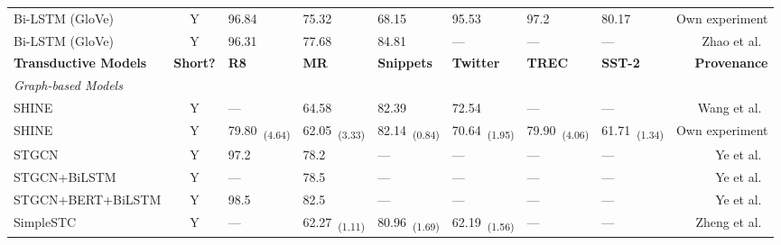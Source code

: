 \documentclass[runningheads]{llncs}
\begin{document}
\begin{table*}[!ht]
\begin{threeparttable}
{\begin{tabular}{lcllllllr}
            Bi-LSTM (GloVe)                         & Y                   & 96.84            & 75.32          & 68.15                             & 95.53            & 97.2          & 80.17          & Own experiment                  \\
            Bi-LSTM (GloVe)                         & Y                   & 96.31            & 77.68          & 84.81\tnote{}                  & ---              & ---           & ---            & Zhao et al.~\cite{zhao2021sequential}      \\
            \toprule
            \textbf{Transductive Models}            & \textbf{Short?} & \textbf{R8}      & \textbf{MR}    & \textbf{Snippets}           & \textbf{Twitter} & \textbf{TREC} & \textbf{SST-2} & \textbf{Provenance}\\
            \midrule
            \textit{Graph-based Models} \\
            SHINE\tnote{}                        & Y                   & ---              & 64.58          & 82.39                             & 72.54            & ---           & ---            & Wang et al.~\cite{shine}                   \\
            SHINE   & Y                   & 79.80~\textsubscript{(4.64)}            & 62.05~\textsubscript{(3.33)}         & 82.14~\textsubscript{(0.84)} & 70.64~\textsubscript{(1.95)}            & 79.90~\textsubscript{(4.06)}     & 61.71~\textsubscript{(1.34)}    & Own experiment                  \\
            STGCN                                   & Y                   & 97.2             & 78.2           & ---                               & ---              & ---           & ---            & Ye et al.~\cite{ye2020document}          \\
            STGCN+BiLSTM                            & Y                   & ---              & 78.5           & ---                               & ---              & ---           & ---            & Ye et al.~\cite{ye2020document}          \\
            STGCN+BERT+BiLSTM                       & Y                   & 98.5             & 82.5           & ---                               & ---              & ---           & ---            & Ye et al.~\cite{ye2020document}          \\
            SimpleSTC\tnote{} & Y & --- & 62.27~\textsubscript{(1.11)} & 80.96~\textsubscript{(1.69)} & 62.19~\textsubscript{(1.56)} & --- & --- & Zheng et al.~\cite{DBLP:conf/emnlp/ZhengWYD22} \\

\end{tabular}}
\end{threeparttable}
\end{table*}
\end{document}
